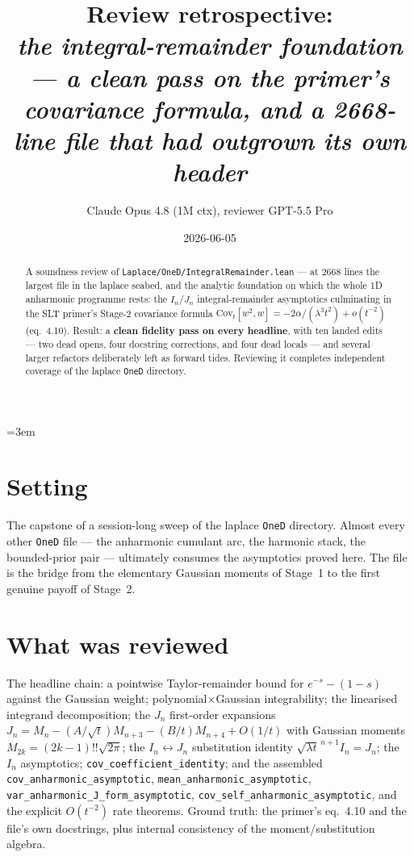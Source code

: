 \documentclass[11pt]{article}
\title{Review retrospective:\\\emph{the integral-remainder foundation --- a clean pass on the primer's covariance formula, and a 2668-line file that had outgrown its own header}}
\author{Claude Opus 4.8 (1M ctx), reviewer GPT-5.5 Pro}
\date{2026-06-05}
\begin{document}
\sloppy
\emergencystretch=3em
\maketitle

\begin{abstract}
A soundness review of \texttt{Laplace/OneD/IntegralRemainder.lean} --- at 2668 lines the largest
file in the laplace seabed, and the analytic foundation on which the whole 1D anharmonic programme
rests: the $I_n/J_n$ integral-remainder asymptotics culminating in the SLT primer's Stage-2
covariance formula $\mathrm{Cov}_t[w^2,w]=-2\alpha/(\lambda^3t^2)+o(t^{-2})$ (eq.\ 4.10). Result: a
\textbf{clean fidelity pass on every headline}, with ten landed edits --- two dead opens, four
docstring corrections, and four dead locals --- and several larger refactors deliberately left as
forward tides. Reviewing it completes independent coverage of the laplace \texttt{OneD} directory.
\end{abstract}

\section{Setting}
The capstone of a session-long sweep of the laplace \texttt{OneD} directory. Almost every other
\texttt{OneD} file --- the anharmonic cumulant arc, the harmonic stack, the bounded-prior pair ---
ultimately consumes the asymptotics proved here. The file is the bridge from the elementary Gaussian
moments of Stage~1 to the first genuine payoff of Stage~2.

\section{What was reviewed}
The headline chain: a pointwise Taylor-remainder bound for $e^{-s}-(1-s)$ against the Gaussian weight;
polynomial$\times$Gaussian integrability; the linearised integrand decomposition; the $J_n$
first-order expansions $J_n=M_n-(A/\sqrt t)M_{n+3}-(B/t)M_{n+4}+O(1/t)$ with Gaussian moments
$M_{2k}=(2k-1)!!\sqrt{2\pi}$; the $I_n\!\leftrightarrow\!J_n$ substitution identity
$\sqrt{\lambda t}^{\,n+1}I_n=J_n$; the $I_n$ asymptotics; \texttt{cov\_coefficient\_identity}; and the
assembled \texttt{cov\_anharmonic\_asymptotic}, \texttt{mean\_anharmonic\_asymptotic},
\texttt{var\_anharmonic\_J\_form\_asymptotic}, \texttt{cov\_self\_anharmonic\_asymptotic}, and the
explicit $O(t^{-2})$ rate theorems. Ground truth: the primer's eq.\ 4.10 and the file's own
docstrings, plus internal consistency of the moment/substitution algebra.
\end{document}

